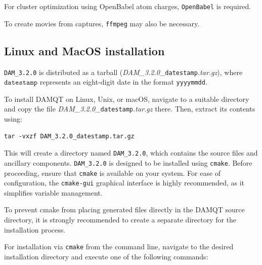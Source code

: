 \documentclass[10pt]{article}
\begin{document}
For cluster optimization using OpenBabel atom charges, \texttt{OpenBabel} is required.

To create movies from captures, \texttt{ffmpeg} may also be necessary.

\subsection{Linux and MacOS installation \label{sec:1.1}}

\texttt{DAM\_3.2.0} is distributed as a tarball
({\it DAM\_3.2.0\_}\texttt{datestamp}{\it .tar.gz}),
where $\texttt{datestamp}$ represents an eight-digit date in the format \texttt{yyyymmdd}.

To install DAMQT on Linux, Unix, or macOS, navigate to a suitable directory and copy the file
{\it DAM\_3.2.0\_}\texttt{datestamp}{\it .tar.gz} there. Then, extract its contents using:
\begin{verbatim}
tar -vxzf DAM_3.2.0_datestamp.tar.gz
\end{verbatim}

This will create a directory named \texttt{DAM\_3.2.0}, which contains the source files and ancillary components.
\texttt{DAM\_3.2.0} is designed to be installed using \texttt{cmake}.
Before proceeding, ensure that \texttt{cmake} is available on your system.
For ease of configuration, the \texttt{cmake-gui} graphical interface is highly recommended, as it simplifies variable management.

To prevent cmake from placing generated files directly in the DAMQT source directory,
it is strongly recommended to create a separate directory for the installation process.

For installation via \texttt{cmake} from the command line, navigate to the desired installation directory and execute one of the following commands:
\end{document}
